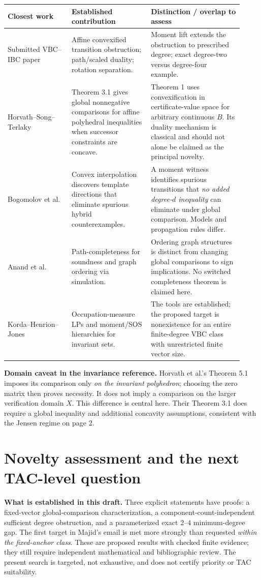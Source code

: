 \documentclass[10pt,letterpaper]{article}
\begin{document}
\begin{center}\small
\begin{tabular}{@{}p{0.25\linewidth}p{0.31\linewidth}p{0.36\linewidth}@{}}
\toprule
Closest work & Established contribution & Distinction / overlap to assess\\\midrule
Submitted VBC--IBC paper \cite{submission} & Affine convexified transition obstruction; path/scaled duality; rotation separation. & Moment lift extends the obstruction to prescribed degree; exact degree-two versus degree-four example.\\[4pt]
Horvath--Song--Terlaky \cite{horvath} & Theorem 3.1 gives global nonnegative comparisons for affine polyhedral inequalities when successor constraints are concave. & Theorem 1 uses convexification in certificate-value space for arbitrary continuous $B$. Its duality mechanism is classical and should not alone be claimed as the principal novelty.\\[4pt]
Bogomolov et al. \cite{bogomolov} & Convex interpolation discovers template directions that eliminate spurious hybrid counterexamples. & A moment witness identifies spurious transitions that \emph{no added degree-$d$ inequality} can eliminate under global comparison. Models and propagation rules differ.\\[4pt]
Anand et al. \cite{anand} & Path-completeness for soundness and graph ordering via simulation. & Ordering graph structures is distinct from changing global comparisons to sign implications. No switched completeness theorem is claimed here.\\[4pt]
Korda--Henrion--Jones \cite{korda} & Occupation-measure LPs and moment/SOS hierarchies for invariant sets. & The tools are established; the proposed target is nonexistence for an entire finite-degree VBC class with unrestricted finite vector size.\\
\bottomrule
\end{tabular}
\end{center}

\textbf{Domain caveat in the invariance reference.} Horvath et al.'s Theorem 5.1 imposes its comparison only \emph{on the invariant polyhedron}; choosing the zero matrix then proves necessity. It does not imply a comparison on the larger verification domain $X$. This difference is central here. Their Theorem 3.1 does require a global inequality and additional concavity assumptions, consistent with the Jensen regime on page 2.

\newpage
\section{Novelty assessment and the next TAC-level question}
\textbf{What is established in this draft.} Three explicit statements have proofs: a fixed-vector global-comparison characterization, a component-count-independent sufficient degree obstruction, and a parameterized exact $2$--$4$ minimum-degree gap. The first target in Majid's email is met more strongly than requested \emph{within the fixed-anchor class}. These are proposed results with checked finite evidence; they still require independent mathematical and bibliographic review. The present search is targeted, not exhaustive, and does not certify priority or TAC suitability.
\end{document}

